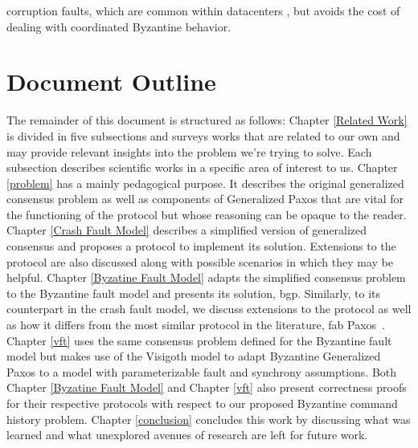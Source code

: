 corruption faults, which are common within datacenters \cite{AmazonS32}, but avoids the cost of dealing with coordinated Byzantine behavior.\par 
\fi

\section{Document Outline}
The remainder of this document is structured as follows: Chapter \ref{Related Work} is divided in five subsections and surveys works that are related to our own and may provide relevant insights into the problem we're trying to solve. Each subsection describes scientific works in a specific area of interest to us. Chapter \ref{problem} has a mainly pedagogical purpose. It describes the original generalized consensus problem as well as components of Generalized Paxos that are vital for the functioning of the protocol but whose reasoning can be opaque to the reader. Chapter \ref{Crash Fault Model} describes a simplified version of generalized consensus and proposes a protocol to implement its solution. Extensions to the protocol are also discussed along with possible scenarios in which they may be helpful. Chapter \ref{Byzatine Fault Model} adapts the simplified consensus problem to the Byzantine fault model and presents its solution, \acrlong{bgp}. Similarly, to its counterpart in the crash fault model, we discuss extensions to the protocol as well as how it differs from the most similar protocol in the literature, \acrfull{fab} Paxos~\cite{Martin2006}. Chapter \ref{vft} uses the same consensus problem defined for the Byzantine fault model but makes use of the Visigoth model to adapt Byzantine Generalized Paxos to a model with parameterizable fault and synchrony assumptions. Both Chapter \ref{Byzatine Fault Model} and Chapter \ref{vft} also present correctness proofs for their respective protocols with respect to our proposed Byzantine command history problem. Chapter \ref{conclusion} concludes this work by discussing what was learned and what unexplored avenues of research are left for future work.
